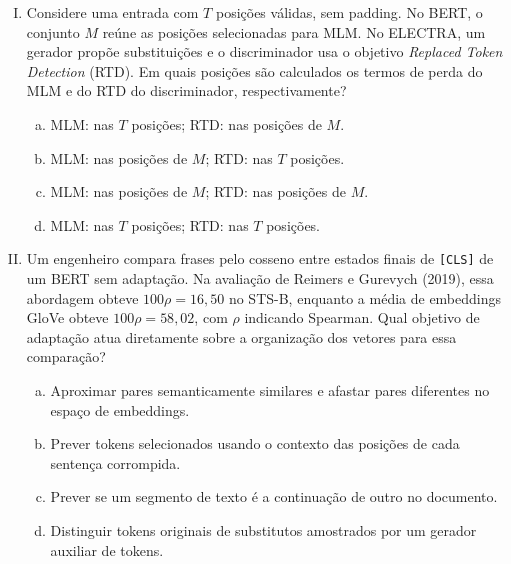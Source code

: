 \documentclass{dlproblemset}
\begin{document}
\begin{enumerate}[I)]
\item Considere uma entrada com $T$ posições válidas, sem padding.
      No BERT, o conjunto $M$ reúne as posições selecionadas para MLM.
      No ELECTRA, um gerador propõe substituições e o discriminador
      usa o objetivo \textit{Replaced Token Detection} (RTD).
      Em quais posições são calculados os termos de perda do MLM
      e do RTD do discriminador, respectivamente?

\begin{enumerate}[a)]
    \item MLM: nas $T$ posições; RTD: nas posições de $M$.
    \item MLM: nas posições de $M$; RTD: nas $T$ posições.
    \item MLM: nas posições de $M$; RTD: nas posições de $M$.
    \item MLM: nas $T$ posições; RTD: nas $T$ posições.
\end{enumerate}

\item Um engenheiro compara frases pelo cosseno entre estados finais
      de \texttt{[CLS]} de um BERT sem adaptação.
      Na avaliação de Reimers e Gurevych (2019), essa abordagem obteve
      $100\rho=16{,}50$ no STS-B, enquanto a média de embeddings GloVe
      obteve $100\rho=58{,}02$, com $\rho$ indicando Spearman.
      Qual objetivo de adaptação atua diretamente sobre a organização
      dos vetores para essa comparação?

\begin{enumerate}[a)]
    \item Aproximar pares semanticamente similares e afastar pares diferentes no espaço de embeddings.
    \item Prever tokens selecionados usando o contexto das posições de cada sentença corrompida.
    \item Prever se um segmento de texto é a continuação de outro no documento.
    \item Distinguir tokens originais de substitutos amostrados por um gerador auxiliar de tokens.
\end{enumerate}


\end{enumerate}
\end{document}
